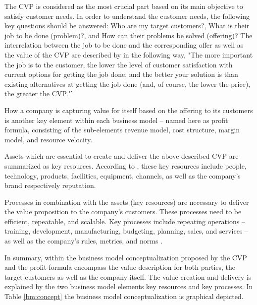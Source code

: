 The \ac{CVP} is considered as the most crucial part based on its main objective to satisfy customer needs. In order to understand the customer needs, the following key questions should be answered: Who are my target customers?, What is their job to be done (problem)?, and How can their problems be solved (offering)? The interrelation between the job to be done and the corresponding offer as well as the value of the \ac{CVP} are described by  \citet[p. 52]{Johnson2008} in the following way, "The more important the job is to the customer, the lower the level of customer satisfaction with current options for getting the job done, and the better your solution is than existing alternatives at getting the job done (and, of course, the lower the price), the greater the CVP."'

How a company is capturing value for itself based on the offering to its customers is another key element within each business model -- named here as profit formula, consisting of the sub-elements revenue model, cost structure, margin model, and resource velocity.

Assets which are essential to create and deliver the above described \ac{CVP} are summarized as key resources. According to \citet[p. 53]{Johnson2008}, these key resources include people, technology, products, facilities, equipment, channels, as well as the company's brand respectively reputation.

Processes in combination with the assets (key resources) are necessary to deliver the value proposition to the company's customers. These processes need to be efficient, repeatable, and scalable. Key processes include repeating operations -- training, development, manufacturing, budgeting, planning, sales, and services -- as well as the company's rules, metrics, and norms \citep[p. 53]{Johnson2008}.

In summary, within the business model conceptualization proposed by \citet[p. 54]{Johnson2008} the \ac{CVP} and the profit formula encompass the value description for both parties, the target customers as well as the company itself. The value creation and delivery is explained by the two business model elements key resources and key processes. In Table \ref{bm:concept} the business model conceptualization is graphical depicted.



